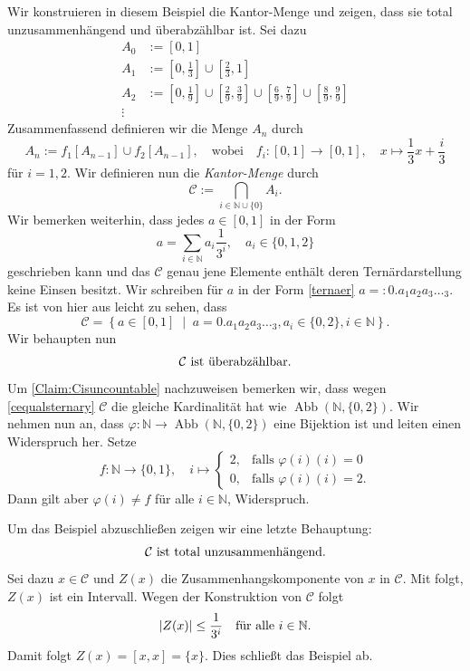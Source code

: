 \documentclass[
12pt, 
openany, 
a4paper, 
final,
fleqn, 
]{myclass}
\numberwithin{equation}{chapter}
\numberwithin{section}{chapter}
\newcommand{\NN}{\mathbb N}
\newcommand{\intersect}{\bigcap}
\newcommand{\set}[2]{\left\{#1\;\middle|\;#2\right\}}
\DeclareMathOperator{\abb}{Abb}
\DeclarePairedDelimiter{\abs}{\lvert}{\rvert}
\begin{document}
\begin{eg}\label{3.9}
Wir konstruieren in diesem Beispiel die Kantor-Menge und zeigen, dass sie total unzusammenhängend und überabzählbar ist. Sei dazu 
\[
\begin{split}
A_0 &:= [0,1]\\
A_1 &:=\left[0, \frac{1}{3}\right] \cup \left[\frac{2}{3}, 1\right]\\
A_2 &:= \left[0, \frac{1}{9}\right]\cup \left[\frac{2}{9}, \frac{3}{9}\right] \cup\left[\frac{6}{9}, \frac{7}{9}\right]\cup \left[\frac{8}{9}, \frac{9}{9}\right]\\
\vdots &
\end{split}
\]
Zusammenfassend definieren wir die Menge $ A_{n} $ durch 
\[
A_{n} := f_{1}[A_{n-1}] \cup f_{2}[A_{n-1}], \quad \text{wobei}\quad f_{i}:[0,1] \to [0,1], \quad x\mapsto \frac{1}{3}x + \frac{i}{3}
\]
für $ i=1, 2 $. Wir definieren nun die \emph{Kantor-Menge} durch 
\[
\mathcal{C} := \intersect_{i\in \mathbb{N}\cup \{0\}} A_{i}.
\]
Wir bemerken weiterhin, dass jedes $a \in [0,1]$ in der Form
\begin{equation}\label{ternaer}
a = \sum_{i\in \NN} a_{i}\frac{1}{3^{i}}, \quad a_{i}\in \{0,1, 2\}
\end{equation}
geschrieben kann und das $ \mathcal{C} $ genau jene Elemente enthält deren Ternärdarstellung keine Einsen besitzt. Wir schreiben für $ a $ in der Form \eqref{ternaer} $ a =: 0.a_{1}a_{2}a_{3}\dots_{3} $. Es ist von hier aus leicht zu sehen, dass 
\begin{equation}\label{cequalsternary}
\mathcal{C} = \set{a \in [0,1]}{a=0.a_{1}a_{2}a_{3}\dots_{3}, a_{i}\in \{0,2\},i\in \mathbb{N}}.
\end{equation}
Wir behaupten nun
\begin{equation}\label{Claim:Cisuncountable}
\text{$ \mathcal{C} $ ist überabzählbar.}
\end{equation}
Um \eqref{Claim:Cisuncountable} nachzuweisen bemerken wir, dass wegen \eqref{cequalsternary} $ \mathcal{C} $ die gleiche Kardinalität hat wie $ \abb(\NN, \{0,2\}) $. Wir nehmen nun an, dass $\varphi: \mathbb{N}\to \abb(\NN, \{0,2\}) $ eine Bijektion ist und leiten einen Widerspruch her. Setze 
\[
f: \mathbb{N}\to \{0,1\}, \quad i \mapsto
\begin{cases}
2,& \text{falls }\varphi(i)(i) = 0\\
0, &\text{falls }\varphi(i)(i)=2.
\end{cases}
\]
Dann gilt aber $\varphi(i) \neq f$ für alle $i\in \mathbb{N}$, Widerspruch. 

Um das Beispiel abzuschließen zeigen wir eine letzte Behauptung: 
\begin{equation}\label{Cunzsmh}
\text{$ \mathcal{C} $ ist total unzusammenhängend.}
\end{equation}
Sei dazu $ x\in \mathcal{C} $ und $ Z(x) $ die Zusammenhangskomponente von $x$ in $ \mathcal{C} $. Mit  folgt, $ Z(x)$ ist ein Intervall. Wegen der Konstruktion von $ \mathcal{C} $ folgt
\[
\abs{Z(x)}\leq \frac{1}{3^{i}} \quad \text{für alle }i\in \mathbb{N}. 
\]
Damit folgt $ Z(x) =[x, x] = \{x\} $. Dies schließt das Beispiel ab. 
\end{eg}
\end{document}
